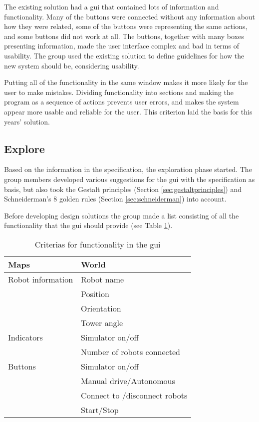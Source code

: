 The existing solution had a \acrshort{gui} that contained lots of information and functionality. Many of the buttons were connected without any information about how they were related, some of the buttons were representing the same actions, and some buttons did not work at all. The buttons, together with many boxes presenting information, made the user interface complex and bad in terms of usability. The group used the existing solution to define guidelines for how the new system should be, considering usability.

Putting all of the functionality in the same window makes it more likely for the user to make mistakes. Dividing functionality into sections and making the program as a sequence of actions prevents user errors, and makes the system appear more usable and reliable for the user. This criterion laid the basis for this years' solution. 

\subsection{Explore}
\label{sec:explore}
Based on the information in the specification, the exploration phase started. The group members developed various suggestions for the \acrshort{gui} with the specification as basis, but also took the Gestalt principles (Section \ref{sec:gestaltprinciples}) and Schneiderman's 8 golden rules (Section \ref{sec:schneiderman}) into account.

Before developing design solutions the group made a list consisting of all the functionality that the \acrshort{gui} should provide (see Table \ref{tab:guicriterias}).
\begin{table}[ht]
\begin{center}
 \begin{tabular}{|l l|} 
 \hline
 Maps               &   World \\
 \hline
 Robot information  &   Robot name \\
                    &   Position \\
                    &   Orientation \\
                    &   Tower angle \\
 \hline
 Indicators         &   Simulator on/off \\
                    &   Number of robots connected \\
 \hline
 Buttons            &   Simulator on/off \\
                    &   Manual drive/Autonomous \\
                    &   Connect to /disconnect robots \\
                    &   Start/Stop \\

\hline
\end{tabular}
\end{center}
\caption{Criterias for functionality in the \acrshort{gui}}
\label{tab:guicriterias}
\end{table}

